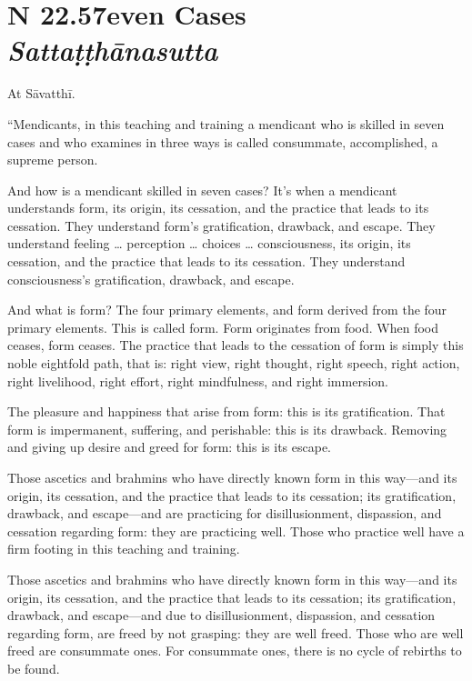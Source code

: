 \documentclass[12pt,openany]{book}%
\newcommand*{\suttatitleacronym}[1]{\smaller[2]{#1}\vspace*{.3em}}
\newcommand*{\suttatitletranslation}[1]{\linebreak{#1}}
\newcommand*{\suttatitleroot}[1]{\linebreak\smaller[2]\itshape{#1}}
\newcommand*{\tocacronym}[1]{\hspace*{-3.3em}{#1}\quad}
\newcommand*{\toctranslation}[1]{#1}
\newcommand*{\tocroot}[1]{(\textit{#1})}
\begin{document}
%
\section*{{\suttatitleacronym SN 22.57}{\suttatitletranslation Seven Cases }{\suttatitleroot Sattaṭṭhānasutta}}
\addcontentsline{toc}{section}{\tocacronym{SN 22.57} \toctranslation{Seven Cases } \tocroot{Sattaṭṭhānasutta}}

At \textsanskrit{Sāvatthī}. 

“Mendicants, in this teaching and training a mendicant who is skilled in seven cases and who examines in three ways is called consummate, accomplished, a supreme person. 

And how is a mendicant skilled in seven cases? It’s when a mendicant understands form, its origin, its cessation, and the practice that leads to its cessation. They understand form’s gratification, drawback, and escape. They understand feeling … perception … choices … consciousness, its origin, its cessation, and the practice that leads to its cessation. They understand consciousness’s gratification, drawback, and escape. 

And what is form? The four primary elements, and form derived from the four primary elements. This is called form. Form originates from food. When food ceases, form ceases. The practice that leads to the cessation of form is simply this noble eightfold path, that is: right view, right thought, right speech, right action, right livelihood, right effort, right mindfulness, and right immersion. 

The pleasure and happiness that arise from form: this is its gratification. That form is impermanent, suffering, and perishable: this is its drawback. Removing and giving up desire and greed for form: this is its escape. 

Those ascetics and brahmins who have directly known form in this way—and its origin, its cessation, and the practice that leads to its cessation; its gratification, drawback, and escape—and are practicing for disillusionment, dispassion, and cessation regarding form: they are practicing well. Those who practice well have a firm footing in this teaching and training. 

Those ascetics and brahmins who have directly known form in this way—and its origin, its cessation, and the practice that leads to its cessation; its gratification, drawback, and escape—and due to disillusionment, dispassion, and cessation regarding form, are freed by not grasping: they are well freed. Those who are well freed are consummate ones. For consummate ones, there is no cycle of rebirths to be found. 
\end{document}
